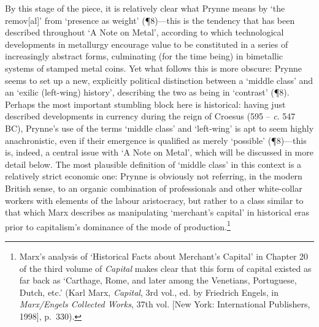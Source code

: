 \documentclass[]{article}
\begin{document}
By this stage of the piece, it is relatively clear what Prynne means by
`the remov{[}al{]}' from `presence as weight' (¶8)---this is the
tendency that has been described throughout `A Note on Metal', according
to which technological developments in metallurgy encourage value to be
constituted in a series of increasingly abstract forms, culminating (for
the time being) in bimetallic systems of stamped metal coins. Yet what
follows this is more obscure: Prynne seems to set up a new, explicitly
political distinction between a `middle class' and an `exilic
(left-wing) history', describing the two as being in `contrast' (¶8).
Perhaps the most important stumbling block here is historical: having
just described developments in currency during the reign of Croesus (595
-- \emph{c}. 547 BC), Prynne's use of the terms `middle class' and
`left-wing' is apt to seem highly anachronistic, even if their emergence
is qualified as merely `possible' (¶8)---this is, indeed, a central
issue with `A Note on Metal', which will be discussed in more detail
below. The most plausible definition of `middle class' in this context
is a relatively strict economic one: Prynne is obviously not referring,
in the modern British sense, to an organic combination of professionals
and other white-collar workers with elements of the labour aristocracy,
but rather to a class similar to that which Marx describes as
manipulating `merchant's capital' in historical eras prior to
capitalism's dominance of the mode of production.\footnote{Marx's
  analysis of `Historical Facts about Merchant's Capital' in Chapter 20
  of the third volume of \emph{Capital} makes clear that this form of
  capital existed as far back as `Carthage, Rome, and later among the
  Venetians, Portuguese, Dutch, etc.' (Karl Marx, \emph{Capital}, 3rd
  vol., ed. by Friedrich Engels, in \emph{Marx/Engels Collected Works},
  37th vol. {[}New York: International Publishers, 1998{]}, p.~330).}
\end{document}
